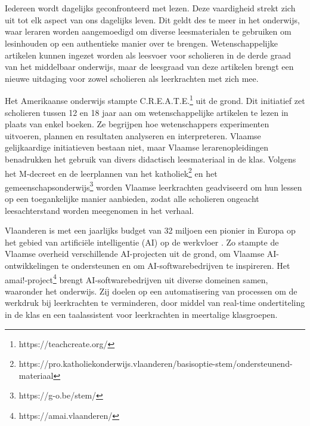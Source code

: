 
\chapter{}%
\label{ch:inleiding}

Iedereen wordt dagelijks geconfronteerd met lezen. Deze vaardigheid strekt zich uit tot elk aspect van ons dagelijks leven. Dit geldt des te meer in het onderwijs, waar leraren worden aangemoedigd om diverse leesmaterialen te gebruiken om lesinhouden op een authentieke manier over te brengen. Wetenschappelijke artikelen kunnen ingezet worden als leesvoer voor scholieren in de derde graad van het middelbaar onderwijs, maar de leesgraad van deze artikelen brengt een nieuwe uitdaging voor zowel scholieren als leerkrachten met zich mee. 

\medspace

Het Amerikaanse onderwijs stampte C.R.E.A.T.E.\footnote{https://teachcreate.org/} uit de grond. Dit initiatief zet scholieren tussen 12 en 18 jaar aan om wetenschappelijke artikelen te lezen in plaats van enkel boeken. Ze begrijpen hoe wetenschappers experimenten uitvoeren, plannen en resultaten analyseren en interpreteren. Vlaamse gelijkaardige initiatieven bestaan niet, maar Vlaamse lerarenopleidingen benadrukken het gebruik van divers didactisch leesmateriaal in de klas. Volgens het M-decreet en de leerplannen van het katholiek\footnote{https://pro.katholiekonderwijs.vlaanderen/basisoptie-stem/ondersteunend-materiaal} en het gemeenschapsonderwijs\footnote{https://g-o.be/stem/} worden Vlaamse leerkrachten geadviseerd om hun lessen op een toegankelijke manier aanbieden, zodat alle scholieren ongeacht leesachterstand worden meegenomen in het verhaal. 

\medspace

Vlaanderen is met een jaarlijks budget van 32 miljoen een pionier in Europa op het gebied van artificiële intelligentie (AI) op de werkvloer \autocite{Crevits2022}. Zo stampte de Vlaamse overheid verschillende AI-projecten uit de grond, om Vlaamse AI-ontwikkelingen te ondersteunen en om AI-softwarebedrijven te inspireren. Het amai!-project\footnote{https://amai.vlaanderen/} brengt AI-softwarebedrijven uit diverse domeinen samen, waaronder het onderwijs. Zij doelen op een automatisering van processen om de werkdruk bij leerkrachten te verminderen, door middel van real-time ondertiteling in de klas en een taalassistent voor leerkrachten in meertalige klasgroepen.


